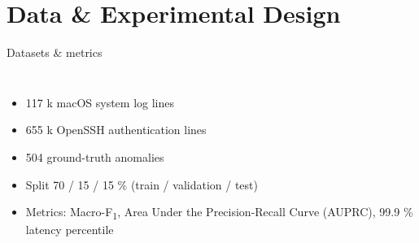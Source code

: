 \documentclass[14pt,aspectratio=169]{beamer}  %
\begin{document}
\section{Data \& Experimental Design}
\begin{frame}{Datasets \& metrics}
\begin{columns}
\begin{itemize}[<+->]
  \item 117 k macOS system log lines
  \item 655 k OpenSSH authentication lines
  \item 504 ground-truth anomalies
  \item Split 70 / 15 / 15 \% (train / validation / test)
  \item Metrics: Macro-F\textsubscript{1},  
        Area Under the Precision-Recall Curve (AUPRC),  
        99.9 \% latency percentile
\end{itemize}

\centering
\begin{adjustbox}{max width=\linewidth}
\end{adjustbox}
\end{columns}
\end{frame}

\end{document}
